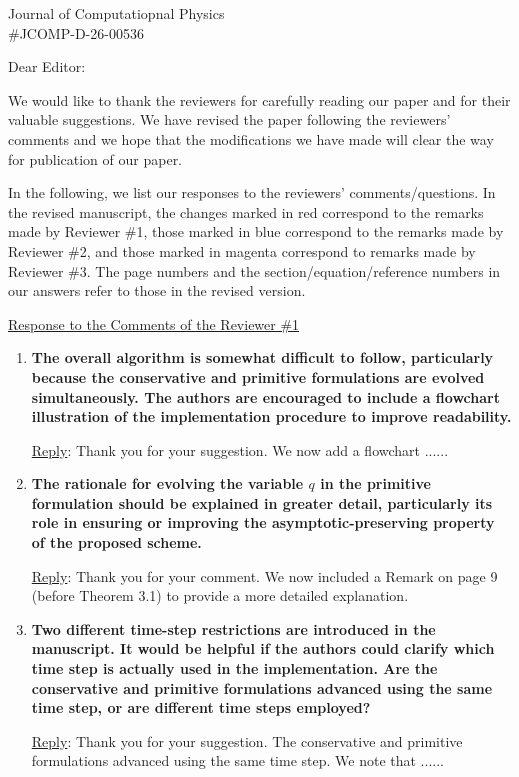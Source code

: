 \documentclass[letter,11pt]{letter}
\begin{document}
\begin{letter}{Journal of Computatiopnal Physics\\\#JCOMP-D-26-00536}

\opening{Dear Editor:} %
We would like to thank the reviewers for carefully reading our paper and for their valuable suggestions. We have revised the paper following the reviewers' comments and we hope that the modifications we have made will clear the way for publication of our paper.

In the following, we list our responses to the reviewers' comments/questions. In the revised manuscript, the changes marked in {\color{red}red} correspond to the remarks made by Reviewer \#1, those marked in {\color{blue}blue} correspond to the remarks made by Reviewer \#2, and those marked in {\color{magenta}magenta} correspond to remarks made by Reviewer \#3. The page numbers and the section/equation/reference numbers in our answers refer to those in the revised version.

\bigskip
\underline{Response to the Comments of the Reviewer \#1}
\begin{enumerate}
	\item
	{\bf The overall algorithm is somewhat difficult to follow, particularly because the conservative and primitive formulations are evolved simultaneously. The authors are encouraged to include a flowchart illustration of the implementation procedure to improve readability.}
	
	\medskip
	{\sc\underline{Reply}}: Thank you for your suggestion. We now add a flowchart ......
	
	\item
	{\bf The rationale for evolving the variable $q$ in the primitive formulation should be explained in greater detail, particularly its role in ensuring or improving the asymptotic-preserving property of the proposed scheme.}
	
	\medskip
	{\sc\underline{Reply}}: Thank you for your comment. We now included a Remark on page 9 (before Theorem 3.1) to provide a more detailed explanation. 
	
	\medskip
	\item
	{\bf Two different time-step restrictions are introduced in the manuscript. It would be helpful if the authors could clarify which time step is actually used in the implementation. Are the conservative and primitive formulations advanced using the same time step, or are different time steps employed?}
	
	\medskip
	{\sc\underline{Reply}}: Thank you for your suggestion. The conservative and primitive formulations advanced using the same time step. We note that ......
	

\end{enumerate}
\end{letter}
\end{document}
